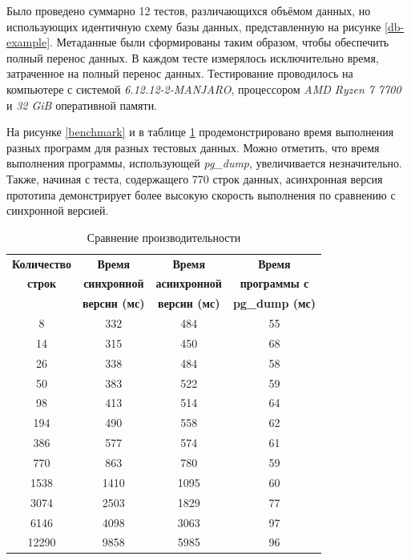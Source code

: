 Было проведено суммарно 12 тестов, различающихся объёмом данных, но использующих идентичную схему базы данных, представленную на рисунке \ref{db-example}. Метаданные были сформированы таким образом, чтобы обеспечить полный перенос данных. В каждом тесте измерялось исключительно время, затраченное на полный перенос данных. Тестирование проводилось на компьютере с системой \textit{6.12.12-2-MANJARO}, процессором \textit{AMD Ryzen 7 7700} и \textit{32 GiB} оперативной памяти.

На рисунке \ref{benchmark} и в таблице \ref{tab:benchmark} продемонстрировано время выполнения разных программ для разных тестовых данных. Можно отметить, что время выполнения программы, использующей \textit{pg\_dump}, увеличивается незначительно. Также, начиная с теста, содержащего 770 строк данных, асинхронная версия прототипа демонстрирует более высокую скорость выполнения по сравнению с синхронной версией.

\begin{table}[h!]
    \caption{Сравнение производительности}
    \begin{tabular}{|c|c|c|c|}
        \hline
        \textbf{Количество} & \textbf{Время} & \textbf{Время} & \textbf{Время} \\
        \textbf{строк} & \textbf{синхронной} & \textbf{асинхронной} & \textbf{программы с} \\
         & \textbf{версии (мс)} & \textbf{версии (мс)} & \textbf{pg\_dump (мс)} \\
        \hline
        8 & 332 & 484 & 55 \\
        \hline
        14 & 315 & 450 & 68 \\
        \hline
        26 & 338 & 484 & 58 \\
        \hline
        50 & 383 & 522 & 59 \\
        \hline
        98 & 413 & 514 & 64 \\
        \hline
        194 & 490 & 558 & 62 \\
        \hline
        386 & 577 & 574 & 61 \\
        \hline
        770 & 863 & 780 & 59 \\
        \hline
        1538 & 1410 & 1095 & 60 \\
        \hline
        3074 & 2503 & 1829 & 77 \\
        \hline
        6146 & 4098 & 3063 & 97 \\
        \hline
        12290 & 9858 & 5985 & 96 \\
        \hline
    \end{tabular}
    \label{tab:benchmark}
\end{table}

